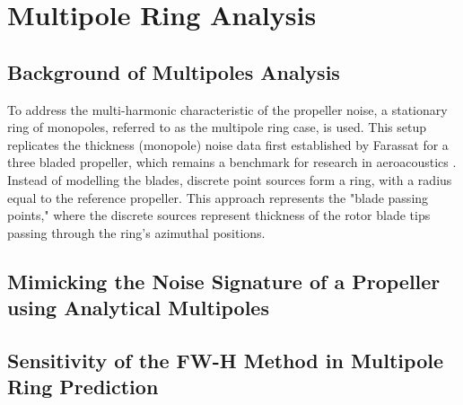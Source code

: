 
\section{Multipole Ring Analysis} \label{sec:multipole_sensitivity}

\subsection{Background of Multipoles Analysis} \label{subsec:BG_multipole}
To address the multi-harmonic characteristic of the propeller noise, a stationary ring of monopoles, referred to as the multipole ring case, is used. This setup replicates the thickness (monopole) noise data first established by Farassat \cite{Farassat1977} for a three bladed propeller, which remains a benchmark for research in aeroacoustics \cite{WoanGregorek1978, Wang2024}. Instead of modelling the blades, discrete point sources form a ring, with a radius equal to the reference propeller. This approach represents the "blade passing points," where the discrete sources represent thickness of the rotor blade tips passing through the ring's azimuthal positions.


\subsection{Mimicking the Noise Signature of a Propeller using Analytical Multipoles} \label{subsec:analytical_multipole}

\subsection{Sensitivity of the FW-H Method in Multipole Ring Prediction}